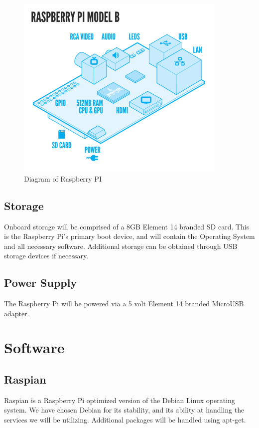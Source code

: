 {            \begin{figure}[htb]
                \centering
                \includegraphics[width=0.9\textwidth]{Images/RaspberryPI.png}
                \caption{Diagram of Raspberry PI}
                \label{fig:RaspPi}
            \end{figure}


        \subsection{Storage}
            Onboard storage will be comprised of a 8GB Element 14 branded SD card. 
            This is the Raspberry Pi’s primary boot device, and will contain 
            the Operating System and all necessary software. Additional storage 
            can be obtained through USB storage devices if necessary. 

        \subsection{Power Supply}
            The Raspberry Pi will be powered via a 5 volt Element 14 branded 
            MicroUSB adapter. 

    \section{Software}
    
        \subsection{Raspian}
            Raspian is a Raspberry Pi optimized version of the Debian Linux 
            operating system. We have chosen Debian for its stability, and its 
            ability at handling the services we will be utilizing. Additional 
            packages will be handled using apt-get.

}
